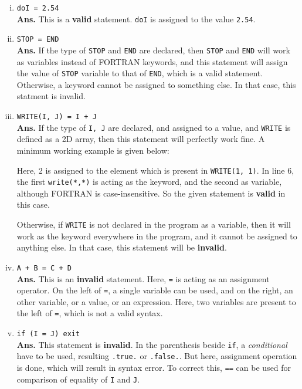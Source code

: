 \documentclass[11pt]{article} %
\begin{document}
\begin{enumerate}[(i)]
    \item \lstinline{doI = 2.54}\\
    \textbf{Ans.} This is a \textbf{valid} statement. \lstinline{doI} is assigned to the value \lstinline{2.54}.
    \item \lstinline{STOP = END}\\
    \textbf{Ans.} If the type of \lstinline{STOP} and \lstinline{END} are declared, then \lstinline{STOP} and \lstinline{END} will work as variables instead of FORTRAN keywords, and this statement will assign the value of \lstinline{STOP} variable to that of \lstinline{END}, which is a valid statement. \\
    Otherwise, a keyword cannot be assigned to something else. In that case, this statment is invalid.
    \item \lstinline{WRITE(I, J) = I + J}\\
    \textbf{Ans.} If the type of \lstinline{I, J} are declared, and assigned to a value, and \lstinline{WRITE} is defined as a 2D array, then this statement will perfectly work fine. A minimum working example is given below:
    
    Here, 2 is assigned to the element which is present in \lstinline{WRITE(1, 1)}. In line 6, the first \lstinline{write(*,*)} is acting as the keyword, and the second as variable, although FORTRAN is case-insensitive. So the given statement is \textbf{valid} in this case. 

    Otherwise, if \lstinline{WRITE} is not declared in the program as a variable, then it will work as the keyword everywhere in the program, and it cannot be assigned to anything else. In that case, this statement will be \textbf{invalid}.
    \newpage
    \item \lstinline{A + B = C + D} \\
    \textbf{Ans.} This is an \textbf{invalid} statement. Here, \lstinline{=} is acting as an assignment operator. On the left of \lstinline{=}, a single variable can be used, and on the right, an other variable, or a value, or an expression. Here, two variables are present to the left of \lstinline{=}, which is not a valid syntax.
    \item \lstinline{if (I = J) exit}\\
    \textbf{Ans.} This statement is \textbf{invalid}. In the parenthesis beside \lstinline{if}, a \textit{conditional} have to be used, resulting \lstinline{.true.} or \lstinline{.false.}. But here, assignment operation is done, which will result in syntax error. To correct this, \lstinline{==} can be used for comparison of equality of \lstinline{I} and \lstinline{J}.
\end{enumerate}
\end{document}
